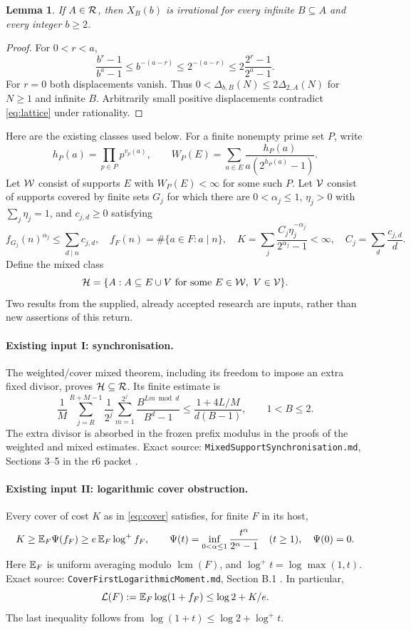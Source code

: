 \documentclass[11pt,a4paper]{article}
\newtheorem{lemma}[theorem]{Lemma}
\theoremstyle{definition}\newtheorem{definition}[theorem]{Definition}
\theoremstyle{remark}\newtheorem{remark}[theorem]{Remark}
\DeclareMathOperator{\lcm}{lcm}
\begin{document}
\begin{lemma}\label{lem:irr}
If $A\in\mathcal R$, then $X_B(b)$ is irrational for every infinite $B\subseteq A$ and every integer $b\ge2$.
\end{lemma}
\begin{proof}
For $0<r<a$,
\[
 \frac{b^r-1}{b^a-1}\le b^{-(a-r)}\le2^{-(a-r)}
 \le 2\frac{2^r-1}{2^a-1}.
\]
For $r=0$ both displacements vanish. Thus
$0<\Delta_{b,B}(N)\le2\Delta_{2,A}(N)$ for $N\ge1$ and infinite $B$.
Arbitrarily small positive displacements contradict \eqref{eq:lattice} under rationality.
\end{proof}

Here are the existing classes used below. For a finite nonempty prime set $P$, write
\[
 h_P(a)=\prod_{p\in P}p^{v_p(a)},\qquad
 W_P(E)=\sum_{a\in E}\frac{h_P(a)}{a(2^{h_P(a)}-1)}.
\]
Let $\mathcal W$ consist of supports $E$ with $W_P(E)<\infty$ for some such $P$.
Let $\mathcal V$ consist of supports covered by finite sets $G_j$ for which there are
$0<\alpha_j\le1$, $\eta_j>0$ with $\sum_j\eta_j=1$, and $c_{j,d}\ge0$ satisfying
\begin{equation}\label{eq:cover}
 f_{G_j}(n)^{\alpha_j}\le\sum_{d\mid n}c_{j,d},\quad
 f_F(n)=\#\{a\in F:a\mid n\},\quad
 K=\sum_j\frac{C_j\eta_j^{-\alpha_j}}{2^{\alpha_j}-1}<\infty,
 \quad C_j=\sum_d\frac{c_{j,d}}d.
\end{equation}
Define the mixed class
\[
 \mathcal H=\{A:A\subseteq E\cup V\text{ for some }E\in\mathcal W,\ V\in\mathcal V\}.
\]
Two results from the supplied, already accepted research are inputs, rather than new assertions of this return.

\paragraph{Existing input I: synchronisation.}
The weighted/cover mixed theorem, including its freedom to impose an extra fixed divisor, proves $\mathcal H\subseteq\mathcal R$. Its finite estimate is
\[
 \frac1M\sum_{j=R}^{R+M-1}\frac1{2^j}\sum_{m=1}^{2^j}
 \frac{B^{Lm\bmod d}}{B^d-1}
 \le\frac{1+4L/M}{d(B-1)},\qquad 1<B\le2.
\]
The extra divisor is absorbed in the frozen prefix modulus in the proofs of the weighted and mixed estimates. Exact source: \texttt{MixedSupportSynchronisation.md}, Sections 3--5 in the r6 packet \cite{mixed}.

\paragraph{Existing input II: logarithmic cover obstruction.}
Every cover of cost $K$ as in \eqref{eq:cover} satisfies, for finite $F$ in its host,
\begin{equation}\label{eq:oldlog}
 K\ge \mathbb E_F\Psi(f_F)\ge e\,\mathbb E_F\log^+ f_F,
 \qquad
 \Psi(t)=\inf_{0<\alpha\le1}\frac{t^\alpha}{2^\alpha-1}\quad(t\ge1),
 \quad\Psi(0)=0.
\end{equation}
Here $\mathbb E_F$ is uniform averaging modulo $\lcm(F)$, and $\log^+t=\log\max(1,t)$.
Exact source: \texttt{CoverFirstLogarithmicMoment.md}, Section B.1 \cite{moment}.
In particular,
\begin{equation}\label{eq:logonebound}
 \mathcal L(F):=\mathbb E_F\log(1+f_F)\le\log2+K/e.
\end{equation}
The last inequality follows from $\log(1+t)\le\log2+\log^+t$.
\end{document}
